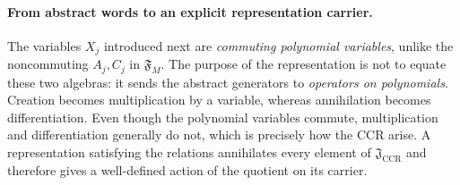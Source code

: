 \paragraph{From abstract words to an explicit representation carrier.}
The variables $X_j$ introduced next are \emph{commuting polynomial
variables}, unlike the noncommuting $A_j,C_j$ in $\mathfrak F_M$.
The purpose of the representation is not to equate these two algebras:
it sends the abstract generators to \emph{operators on polynomials}.
Creation becomes multiplication by a variable, whereas annihilation
becomes differentiation.  Even though the polynomial variables commute,
multiplication and differentiation generally do not, which is precisely
how the CCR arise.  A representation satisfying the relations annihilates
every element of $\mathfrak J_{\mathrm{CCR}}$ and therefore gives a
well-defined action of the quotient on its carrier.

